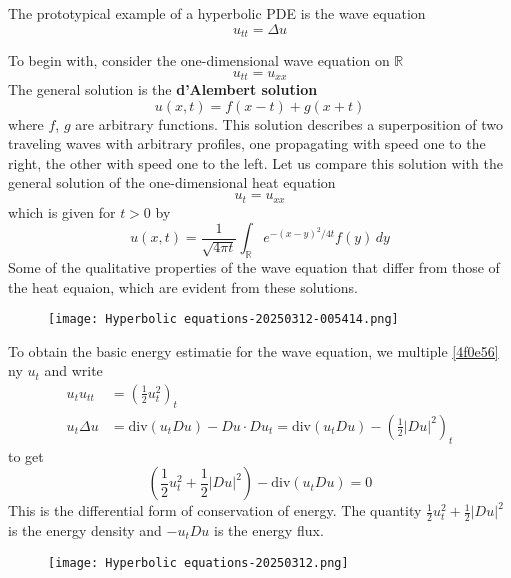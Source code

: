 The prototypical example of a hyperbolic PDE is the wave equation
\begin{equation}
u_{tt}=\Delta u
\label{4f0e56}
\end{equation}

To begin with, consider the one-dimensional wave equation on $\mathbb{R}$
\[
u_{tt}=u_{xx}
\]
The general solution is the \textbf{d'Alembert solution}
\[
u(x,t)=f(x-t)+g(x+t)
\]
where $f$, $g$ are arbitrary functions. This solution describes a superposition of two traveling waves with arbitrary profiles, one propagating with speed one to the right, the other with speed one to the left.
Let us compare this solution with the general solution of the one-dimensional heat equation
\[
u_{t}=u_{x x}
\]
which is given for $t>0$ by
\[
u(x,t)=\frac{1}{\sqrt{ 4\pi t }}\int_{\mathbb{R}}^{} e^{ -(x-y)^{2}/4t }f(y) \, dy
\]
Some of the qualitative properties of the wave equation that differ from those of the heat equaion, which are evident from these solutions.

\begin{figure}[H]
\centering
\texttt{[image: Hyperbolic equations-20250312-005414.png]}
\label{}
\end{figure}

To obtain the basic energy estimatie for the wave equation, we multiple \cref{4f0e56} ny $u_{t}$ and write
\[
\begin{aligned}
u_{t}u_{tt} & =\left( \frac{1}{2}u_{t}^{2} \right)_{t} \\
u_{t}\Delta u & =\mathrm{div}(u_{t}Du)-Du\cdot Du_{t}=\mathrm{div}(u_{t}Du)-\left( \frac{1}{2}\lvert Du \rvert ^{2} \right)_{t}
\end{aligned}
\]
to get
\[
\left( \frac{1}{2}u_{t}^{2}+\frac{1}{2}\lvert Du \rvert ^{2} \right)-\mathrm{div}(u_{t}Du)=0
\]
This is the differential form of conservation of energy. The quantity $\frac{1}{2}u_{t}^{2}+\frac{1}{2}\lvert Du \rvert ^{2}$ is the energy density and $-u_{t}Du$ is the energy flux.

\begin{figure}[H]
\centering
\texttt{[image: Hyperbolic equations-20250312.png]}
\label{}
\end{figure}
